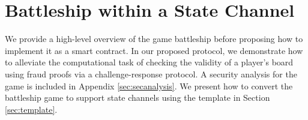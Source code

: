 \documentclass{llncs}
\newcommand{\hcell}{\mathsf{hcell}}
\newcommand{\hship}{\mathsf{hship}}
\begin{document}

\section{Battleship within a State Channel} 

We provide a high-level overview of the game battleship before proposing how to implement it as a smart contract.  
In our proposed protocol, we demonstrate how to alleviate the computational task of checking the validity of a player's board using fraud proofs via a challenge-response protocol.
A security analysis for the game is included in Appendix \ref{sec:secanalysis}.
We present how to convert the battleship game to support state channels using the template in Section \ref{sec:template}. 
\end{document}
